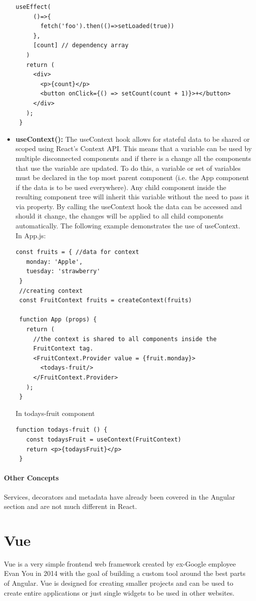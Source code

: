\begin{itemize}
\begin{Verbatim}[frame=single]
   useEffect(
     ()=>{
       fetch('foo').then(()=>setLoaded(true))
     },
     [count] // dependency array
   )
   return (
     <div>
       <p>{count}</p>		            
       <button onClick={() => setCount(count + 1)}>+</button>
     </div>
   );
 }
\end{Verbatim}
\pagebreak
\item \textbf{useContext():} The useContext hook allows for stateful data to be shared or scoped using React's Context API. This means that a variable can be used by multiple disconnected components and if there is a change all the components that use the variable are updated. To do this, a variable or set of variables must be declared in the top most parent component (i.e. the App component if the data is to be used everywhere). Any child component inside the resulting component tree will inherit this variable without the need to pass it via property. By calling the useContext hook the data can be accessed and should it change, the changes will be applied to all child components automatically. The following example demonstrates the use of useContext.\\[0.5cm]
In App.js:
\begin{Verbatim}[frame=single]
 const fruits = { //data for context
   monday: 'Apple',
   tuesday: 'strawberry'
 }
 //creating context
 const FruitContext fruits = createContext(fruits)

 function App (props) {
   return (
     //the context is shared to all components inside the
     FruitContext tag.
     <FruitContext.Provider value = {fruit.monday}>
       <todays-fruit/>
     </FruitContext.Provider>
   );  
 }
\end{Verbatim}
In todays-fruit component
\begin{Verbatim}[frame=single]
 function todays-fruit () {
   const todaysFruit = useContext(FruitContext)
   return <p>{todaysFruit}</p>
 }
\end{Verbatim}
\end{itemize}

\subsubsection{Other Concepts}
Services, decorators and metadata have already been covered in the Angular section and are not much different in React.
\chapter{Vue}
Vue is a very simple frontend web framework created by ex-Google employee Evan You in 2014 with the goal of building a custom tool around the best parts of Angular. Vue is designed for creating smaller projects and can be used to create entire applications or just single widgets to be used in other websites.
